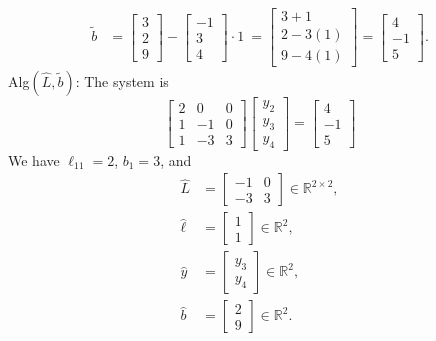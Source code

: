 \documentclass{report}
\begin{document}
    \begin{align*}
        \tilde{b} &= \begin{bmatrix} 3 \\ 2 \\ 9 \end{bmatrix}
        - \begin{bmatrix} -1 \\ 3 \\ 4 \end{bmatrix} \cdot  1 \
        = \begin{bmatrix} 3 + 1 \\ 2 -3(1) \\ 9-4(1) \end{bmatrix}
        = \begin{bmatrix} 4 \\ -1 \\ 5 \end{bmatrix}
    .\end{align*}
    Alg$(\hat{L}, \tilde{b})$: The system is
        \[
            \begin{bmatrix}
                2 & 0 & 0 \\
                1 & -1 & 0 \\
                1 & -3 & 3
            \end{bmatrix}
            \begin{bmatrix}
                y_{2} \\
                y_{3} \\
                y_{4}
            \end{bmatrix}
            =
            \begin{bmatrix}
                4 \\ -1 \\ 5
            \end{bmatrix}
        \]
    We have $\ell_{11} = 2$, $b_{1} = 3$, and 
    \begin{align*}
        \hat{L} &= \begin{bmatrix} -1 & 0 \\ -3 & 3 \end{bmatrix} \in \mathbb{R}^{2\times 2}, \\
        \hat{\ell} &= \begin{bmatrix} 1 \\1 \end{bmatrix} \in \mathbb{R}^{2}, \\
        \hat{y} &= \begin{bmatrix} y_{3} \\ y_{4} \end{bmatrix} \in \mathbb{R}^{2},\\
        \hat{b} &= \begin{bmatrix} 2 \\ 9 \end{bmatrix} \in \mathbb{R}^{2}
    .\end{align*}
\end{document}
